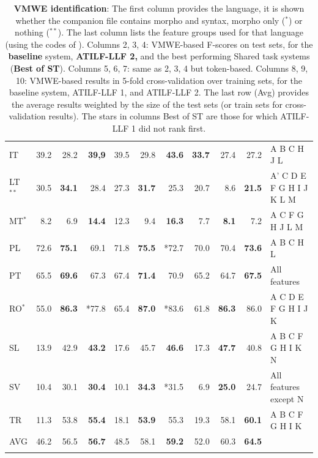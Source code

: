 \documentclass[output=paper,modfonts]{langscibook}
\begin{document}
\begin{table}
\begin{tabular}{lrrrrrrrrrl}
IT 	& 39.2 			& 28.2 			& \textbf{39,9} & 39.5 & 29.8 & \textbf{43.6} & \textbf{33.7} & 27.4 & 27.2 & \scriptsize{A B C H J L} \\
LT$^{**}$ 	& 30.5 			& \textbf{34.1} & 28.4 & 27.3 & \textbf{31.7} & 25.3 & 20.7 & 8.6 & \textbf{21.5} & \scriptsize{A' C D E F G H I J K L M} \\
MT$^{*}$ 	& 8.2 			& 6.9 			& \textbf{14.4} & 12.3 & 9.4 & \textbf{16.3} & 7.7 & \textbf{8.1} & 7.2 & \scriptsize{A C F G H J L M} \\
PL 	& 72.6 			& \textbf{75.1} & 69.1 & 71.8 & \textbf{75.5} & *72.7 & 70.0 & 70.4 & \textbf{73.6} & \scriptsize{A B C H L} \\ 
PT 	& 65.5 			& \textbf{69.6} & 67.3 & 67.4 & \textbf{71.4} & 70.9 & 65.2 & 64.7 & \textbf{67.5} & \scriptsize{All features} \\
RO$^{*}$ 	& 55.0 			& \textbf{86.3} & *77.8 & 65.4 & \textbf{ 87.0} & *83.6 & 61.8 & \textbf{86.3} & 86.0 & \scriptsize{A C D E F G H I J K} \\
SL 	& 13.9 			& 42.9 			& \textbf{ 43.2} & 17.6 & 45.7 & \textbf{46.6} & 17.3 & \textbf{47.7} & 40.8 & \scriptsize{A B C F G H I K N} \\
SV 	& 10.4 			& 30.1 			& \textbf{30.4} & 10.1 & \textbf{34.3} & *31.5 & 6.9 & \textbf{25.0} & 24.7 & \scriptsize{All features except N} \\
TR 	& 11.3 			& 53.8 			& \textbf{55.4} & 18.1 & \textbf{53.9} & 55.3 & 19.3 & 58.1 & \textbf{60.1} & \scriptsize{A B C F G H I K} \\ \midrule
AVG & 46.2 & 56.5 & \textbf{56.7} & 48.5 & 58.1 & \textbf{59.2} & 52.0 & 60.3 & \textbf{64.5} &  \\
\lspbottomrule
\end{tabular}
\caption{\textbf{VMWE identification}: The first column provides the language, it is shown whether the companion file contains morpho and syntax, morpho only ($^{*}$) or nothing ($^{**}$). The last column lists the feature groups used for that language (using the codes of ). Columns  2, 3, 4: VMWE-based F-scores on test sets, for the \textbf{baseline} system, \textbf{ATILF-LLF 2, }and the best performing Shared task systems (\textbf{Best of ST}). Columns 5, 6, 7: same as 2, 3, 4 but token-based. Columns 8, 9, 10: VMWE-based results in 5-fold cross-validation over training sets, for the baseline system, ATILF-LLF 1, and ATILF-LLF 2.  The last row (Avg) provides the average results weighted by the size of the test sets (or train sets for cross-validation results). The stars in columns Best of ST are those for which ATILF-LLF 1 did not rank first.}
\label{tab:iden}
\end{table}
\end{document}
